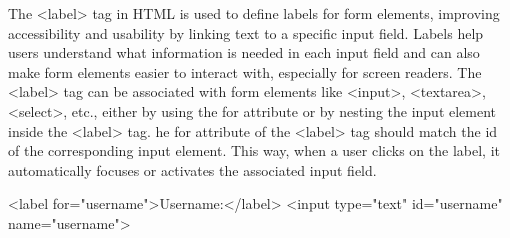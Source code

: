 \documentclass{report}
\begin{document}
        \bigbreak \noindent 
        The <label> tag in HTML is used to define labels for form elements, improving accessibility and usability by linking text to a specific input field. Labels help users understand what information is needed in each input field and can also make form elements easier to interact with, especially for screen readers.
        \bigbreak \noindent 
        The <label> tag can be associated with form elements like <input>, <textarea>, <select>, etc., either by using the for attribute or by nesting the input element inside the <label> tag.
        \bigbreak \noindent 
        he for attribute of the <label> tag should match the id of the corresponding input element. This way, when a user clicks on the label, it automatically focuses or activates the associated input field.
        \bigbreak \noindent 
        \begin{htmlcode}
            <label for="username">Username:</label>
            <input type="text" id="username" name="username">
        \end{htmlcode}
        \bigbreak \noindent 
\end{document}
